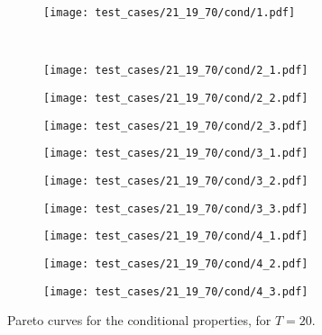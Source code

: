 \begin{figure}[H]
\centering
\begin{subfigure}{0.32\textwidth}
  \centering
  \texttt{[image: test\_cases/21\_19\_70/cond/1.pdf]}
\end{subfigure}\\
\begin{subfigure}{0.32\textwidth}
  \centering
  \texttt{[image: test\_cases/21\_19\_70/cond/2\_1.pdf]}
\end{subfigure} 
\begin{subfigure}{0.32\textwidth}
  \centering
  \texttt{[image: test\_cases/21\_19\_70/cond/2\_2.pdf]}
\end{subfigure}
\begin{subfigure}{0.32\textwidth}
  \centering
  \texttt{[image: test\_cases/21\_19\_70/cond/2\_3.pdf]}
\end{subfigure}
\begin{subfigure}{0.32\textwidth}
  \centering
  \texttt{[image: test\_cases/21\_19\_70/cond/3\_1.pdf]}
\end{subfigure}
\begin{subfigure}{0.32\textwidth}
  \centering
  \texttt{[image: test\_cases/21\_19\_70/cond/3\_2.pdf]}
\end{subfigure}
\begin{subfigure}{0.32\textwidth}
  \centering
  \texttt{[image: test\_cases/21\_19\_70/cond/3\_3.pdf]}
\end{subfigure}
\begin{subfigure}{0.32\textwidth}
  \centering
  \texttt{[image: test\_cases/21\_19\_70/cond/4\_1.pdf]}
\end{subfigure} 
\begin{subfigure}{0.32\textwidth}
  \centering
  \texttt{[image: test\_cases/21\_19\_70/cond/4\_2.pdf]}
\end{subfigure}
\begin{subfigure}{0.32\textwidth}
  \centering
  \texttt{[image: test\_cases/21\_19\_70/cond/4\_3.pdf]}
\end{subfigure}
\caption{Pareto curves for the conditional properties, for $T = 20$.}
\label{fig:test_case_1_cond}
\end{figure}

